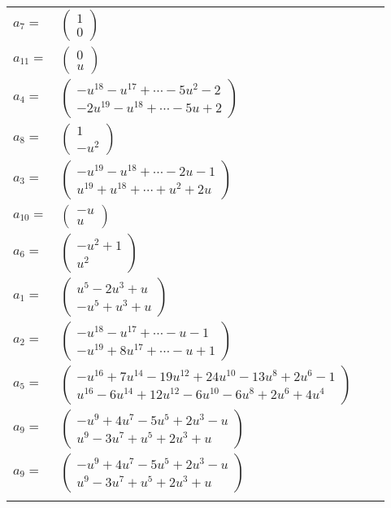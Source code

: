 \documentclass[1p]{elsarticle_modified}
\theoremstyle{definition}
\begin{document}
\begin{tabular}{m{7pt} m{180pt} m{7pt} m{180pt} }
\flushright $a_{7}=$&$\begin{pmatrix}1\\0\end{pmatrix}$ \\
\flushright $a_{11}=$&$\begin{pmatrix}0\\u\end{pmatrix}$ \\
\flushright $a_{4}=$&$\begin{pmatrix}- u^{18}- u^{17}+\cdots-5 u^2-2\\-2 u^{19}- u^{18}+\cdots-5 u+2\end{pmatrix}$ \\
\flushright $a_{8}=$&$\begin{pmatrix}1\\- u^2\end{pmatrix}$ \\
\flushright $a_{3}=$&$\begin{pmatrix}- u^{19}- u^{18}+\cdots-2 u-1\\u^{19}+u^{18}+\cdots+u^2+2 u\end{pmatrix}$ \\
\flushright $a_{10}=$&$\begin{pmatrix}- u\\u\end{pmatrix}$ \\
\flushright $a_{6}=$&$\begin{pmatrix}- u^2+1\\u^2\end{pmatrix}$ \\
\flushright $a_{1}=$&$\begin{pmatrix}u^5-2 u^3+u\\- u^5+u^3+u\end{pmatrix}$ \\
\flushright $a_{2}=$&$\begin{pmatrix}- u^{18}- u^{17}+\cdots- u-1\\- u^{19}+8 u^{17}+\cdots- u+1\end{pmatrix}$ \\
\flushright $a_{5}=$&$\begin{pmatrix}- u^{16}+7 u^{14}-19 u^{12}+24 u^{10}-13 u^8+2 u^6-1\\u^{16}-6 u^{14}+12 u^{12}-6 u^{10}-6 u^8+2 u^6+4 u^4\end{pmatrix}$ \\
\flushright $a_{9}=$&$\begin{pmatrix}- u^9+4 u^7-5 u^5+2 u^3- u\\u^9-3 u^7+u^5+2 u^3+u\end{pmatrix}$\\ \flushright $a_{9}=$&$\begin{pmatrix}- u^9+4 u^7-5 u^5+2 u^3- u\\u^9-3 u^7+u^5+2 u^3+u\end{pmatrix}$\\&\end{tabular}
\end{document}
